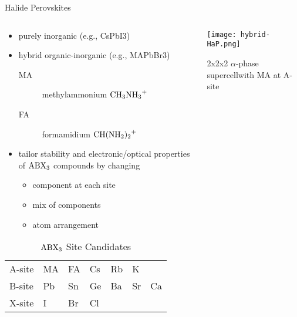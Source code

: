 \documentclass[10pt, aspectratio=169, presentation]{beamer}
\begin{document}
\begin{frame}[label={sec:orgf525afb}]{Halide Perovskites}
\begin{columns}
\begin{column}{0.6\columnwidth}
\begin{itemize}
\item purely inorganic (e.g., CsPbI3)
\item hybrid organic-inorganic (e.g., MAPbBr3)
\begin{description}
\item[{MA}] methylammonium \(\ce{CH3NH3+}\)
\item[{FA}] formamidium \(\ce{CH(NH2)2+}\)
\end{description}
\item tailor stability and electronic/optical properties of \(\ce{ABX3}\)
compounds by changing
\begin{itemize}
\item component at each site
\item mix of components
\item atom arrangement
\end{itemize}
\end{itemize}

\begin{table}[htbp]
\caption{\(\ce{ABX3}\) Site Candidates}
\centering
\begin{tabular}{l|llllll}
A-site & MA & FA & Cs & Rb & K & \\[0pt]
B-site & Pb & Sn & Ge & Ba & Sr & Ca\\[0pt]
X-site & I & Br & Cl &  &  & \\[0pt]
\end{tabular}
\end{table}
\end{column}

\begin{column}{0.4\columnwidth}
\begin{center}
\texttt{[image: hybrid-HaP.png]}
\end{center}

\center{}2x2x2 \(\alpha\)-phase supercell\break \alert{with MA at A-site}
\end{column}
\end{columns}
\end{frame}
\end{document}
